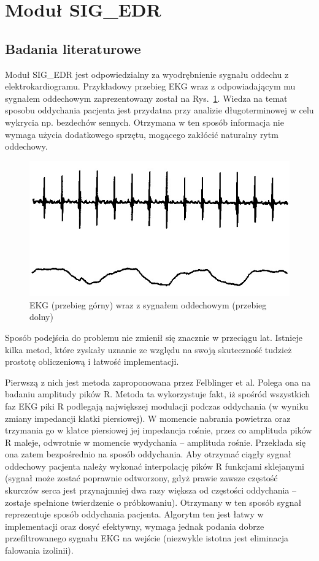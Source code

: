 \section{Moduł SIG\_EDR}
\subsection{Badania literaturowe}
	Moduł SIG\_EDR jest odpowiedzialny za wyodrębnienie sygnału oddechu z elektrokardiogramu. Przykładowy przebieg EKG wraz z odpowiadającym mu sygnałem oddechowym zaprezentowany został na Rys.~\ref{fig:ecg_oddech}. Wiedza na temat sposobu oddychania pacjenta jest przydatna przy analizie długoterminowej w celu wykrycia np. bezdechów sennych. Otrzymana w ten sposób informacja nie wymaga użycia dodatkowego sprzętu, mogącego zakłócić naturalny rytm oddechowy. 
\begin{figure}[ht]
\centering
\includegraphics[width=12cm]{SIG_EDR/img/ecg_oddech.jpg}
\caption{EKG (przebieg górny) wraz z sygnałem oddechowym (przebieg dolny)}
\label{fig:ecg_oddech}
\end{figure}

	Sposób podejścia do problemu nie zmienił się znacznie w przeciągu lat. Istnieje kilka metod, które zyskały uznanie ze względu na swoją skuteczność tudzież prostotę obliczeniową i łatwość implementacji. 
	
	Pierwszą z nich jest metoda zaproponowana przez Felblinger et al. Polega ona na badaniu amplitudy pików R. Metoda ta wykorzystuje fakt, iż spośród wszystkich faz  EKG piki R podlegają największej modulacji podczas oddychania (w wyniku zmiany impedancji klatki piersiowej). W momencie nabrania powietrza oraz trzymania go w klatce piersiowej jej impedancja rośnie, przez co amplituda pików R maleje, odwrotnie w momencie wydychania – amplituda rośnie. Przekłada się ona zatem bezpośrednio na sposób oddychania. Aby otrzymać ciągły sygnał oddechowy pacjenta należy wykonać interpolację pików R funkcjami sklejanymi (sygnał może zostać poprawnie odtworzony, gdyż prawie zawsze częstość skurczów serca jest przynajmniej dwa razy większa od częstości oddychania – zostaje spełnione twierdzenie o próbkowaniu).  Otrzymany w ten sposób sygnał reprezentuje sposób oddychania pacjenta. Algorytm ten jest łatwy w implementacji oraz dosyć efektywny, wymaga jednak podania dobrze przefiltrowanego sygnału EKG na wejście (niezwykle istotna jest eliminacja falowania izolinii).
	
